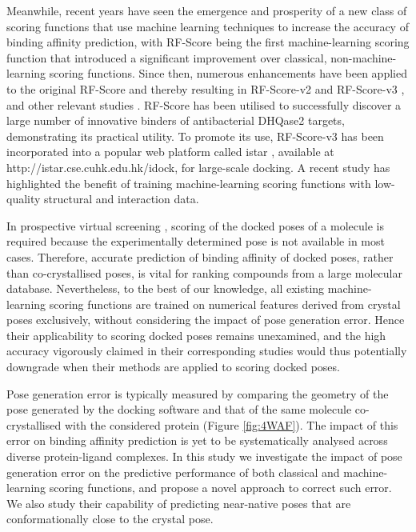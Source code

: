 \documentclass[twocolumn]{bmcart}
\begin{document}
Meanwhile, recent years have seen the emergence and prosperity of a new class of scoring functions that use machine learning techniques to increase the accuracy of binding affinity prediction, with RF-Score \cite{564} being the first machine-learning scoring function that introduced a significant improvement over classical, non-machine-learning scoring functions. Since then, numerous enhancements have been applied to the original RF-Score \cite{564} and thereby resulting in RF-Score-v2 \cite{1370} and RF-Score-v3 \cite{1647}, and other relevant studies \cite{1432}. RF-Score has been utilised \cite{1281} to successfully discover a large number of innovative binders of antibacterial DHQase2 targets, demonstrating its practical utility. To promote its use, RF-Score-v3 has been incorporated into a popular web platform called istar \cite{1362}, available at http://istar.cse.cuhk.edu.hk/idock, for large-scale docking. A recent study \cite{1663} has highlighted the benefit of training machine-learning scoring functions with low-quality structural and interaction data.

In prospective virtual screening \cite{1362}, scoring of the docked poses of a molecule is required because the experimentally determined pose is not available in most cases. Therefore, accurate prediction of binding affinity of docked poses, rather than co-crystallised poses, is vital for ranking compounds from a large molecular database. Nevertheless, to the best of our knowledge, all existing machine-learning scoring functions are trained on numerical features derived from crystal poses exclusively, without considering the impact of pose generation error. Hence their applicability to scoring docked poses remains unexamined, and the high accuracy vigorously claimed in their corresponding studies would thus potentially downgrade when their methods are applied to scoring docked poses.

Pose generation error is typically measured by comparing the geometry of the pose generated by the docking software and that of the same molecule co-crystallised with the considered protein (Figure \ref{fig:4WAF}). The impact of this error on binding affinity prediction is yet to be systematically analysed across diverse protein-ligand complexes. In this study we investigate the impact of pose generation error on the predictive performance of both classical and machine-learning scoring functions, and propose a novel approach to correct such error. We also study their capability of predicting near-native poses that are conformationally close to the crystal pose.
\end{document}
